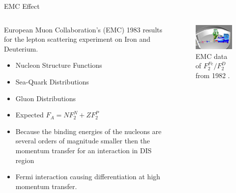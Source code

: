 \documentclass{beamer}
\begin{document}
\begin{frame}{EMC Effect}
	\begin{columns}[c] %

		\vspace{-15pt}
		\begin{block}{}
			European Muon Collaboration's (EMC) 1983  results for the lepton scattering experiment on Iron and Deuterium. 
			\begin{itemize}
				\item Nucleon Structure Functions
				\item Sea-Quark Distributions 
				\item Gluon Distributions 
				\item Expected $ F_A = NF_2^N + ZF_2^P $
				\item Because the binding energies of the nucleons are several orders of magnitude smaller then the momentum transfer for an interaction in DIS region
				\item Fermi interaction causing differentiation at high momentum transfer.
			\end{itemize}
		\end{block}

	
		\begin{figure}
			\caption{\label{EMC} EMC data of $ F_2^{Fe}/F_2^{D}$  from 1982 \cite{cc}.}
	 		\includegraphics[width =5.5cm]{../images/EMC_cc.jpg}
	 	\end{figure}
 	\end{columns}
\end{frame}
\end{document}
